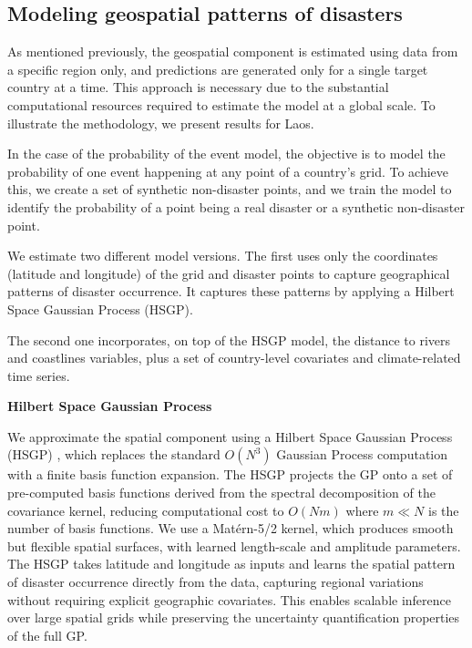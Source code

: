 \subsection{Modeling geospatial patterns of disasters}

As mentioned previously, the geospatial component is estimated using data from a specific region only, and predictions are generated only for a single target country at a time. This approach is necessary due to the substantial computational resources required to estimate the model at a global scale. To illustrate the methodology, we present results for Laos.

In the case of the probability of the event model, the objective is to model the probability of one event happening at any point of a country's grid. To achieve this, we create a set of synthetic non-disaster points, and we train the model to identify the probability of a point being a real disaster or a synthetic non-disaster point.

We estimate two different model versions. The first uses only the coordinates (latitude and longitude) of the grid and disaster points to capture geographical patterns of disaster occurrence. It captures these patterns by applying a Hilbert Space Gaussian Process (HSGP).

The second one incorporates, on top of the HSGP model, the distance to rivers and coastlines variables, plus a set of country-level covariates and climate-related time series.

\textbf{Hilbert Space Gaussian Process}

We approximate the spatial component using a Hilbert Space Gaussian Process (HSGP) \citep{solin2020hilbert}, which replaces the standard $O(N^3)$ Gaussian Process computation with a finite basis function expansion. The HSGP projects the GP onto a set of pre-computed basis functions derived from the spectral decomposition of the covariance kernel, reducing computational cost to $O(Nm)$ where $m \ll N$ is the number of basis functions. We use a Mat\'{e}rn-5/2 kernel, which produces smooth but flexible spatial surfaces, with learned length-scale and amplitude parameters. The HSGP takes latitude and longitude as inputs and learns the spatial pattern of disaster occurrence directly from the data, capturing regional variations without requiring explicit geographic covariates. This enables scalable inference over large spatial grids while preserving the uncertainty quantification properties of the full GP.

